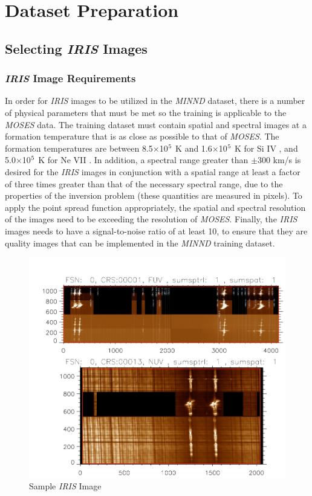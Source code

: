 \documentclass[10pt,a4paper,titlepage]{article}
\begin{document}
	\section{Dataset Preparation}
			\subsection{Selecting \textit{IRIS} Images}
				\label{IRIS Image}
			\subsubsection{\textit{IRIS} Image Requirements}
			
					In order for \textit{IRIS} images to be utilized in the \textit{MINND} dataset, there is a number of physical parameters that must be met so the training is applicable to the \textit{MOSES} data. The training dataset must contain spatial and spectral images at a formation temperature that is as close as possible to that of \textit{MOSES}. The formation temperatures are between 8.5$\times$10$\textsuperscript{5}$ K and 1.6$\times$10$\textsuperscript{5}$ K for Si IV \cite{1538-4357-477-2-L119}, and 5.0$\times$10$\textsuperscript{5}$ K for Ne VII \cite{bray2005plasma}. In addition, a spectral range greater than $\pm$300 km/s is desired for the \textit{IRIS} images in conjunction with a spatial range at least a factor of three times greater than that of the necessary spectral range, due to the properties of the inversion problem (these quantities are measured in pixels). To apply the point spread function appropriately, the spatial and spectral resolution of the images need to be exceeding the resolution of \textit{MOSES}. Finally, the \textit{IRIS} images needs to have a signal-to-noise ratio of at least 10, to ensure that they are quality images that can be implemented in the \textit{MINND} training dataset. 
								 
					\begin{figure}[H]
						\includegraphics[scale=0.46]{IRISsample}
						\centering
						\caption{Sample \textit{IRIS} Image}
						\centering
					\end{figure}
\end{document}
